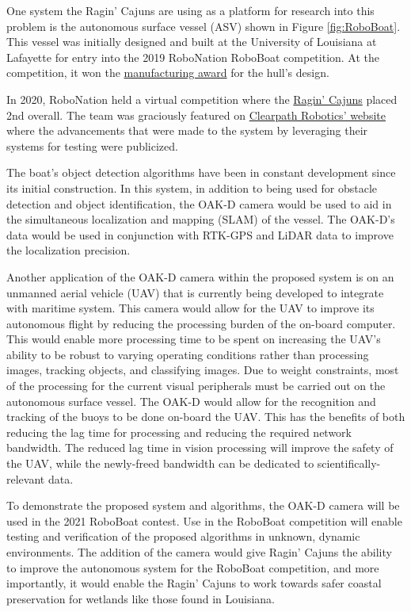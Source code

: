 \documentclass[12 pt]{article}
\begin{document}
%
One system the Ragin' Cajuns are using as a platform for research into this problem is the autonomous surface vessel (ASV) shown in Figure \ref{fig:RoboBoat}. This vessel was initially designed and built at the University of Louisiana at Lafayette for entry into the 2019 RoboNation RoboBoat competition. At the competition, it won the \href{https://mechanical.louisiana.edu/news-events/news/20190627/university-team-earns-manufacturing-award-international-roboboat}{manufacturing award} for the hull's design. 

In 2020, RoboNation held a virtual competition where the \href{https://crawlab.github.io/RoboBoat-2020/} {Ragin' Cajuns} placed 2nd overall. The team was graciously featured on \href{https://clearpathrobotics.com/blog/2020/11/research-team-uses-clearpath-simulation-in-second-place-finish-at-roboboat-2020/}{Clearpath Robotics' website} where the advancements that were made to the system by leveraging their systems for testing were publicized. 

The boat's object detection algorithms have been in constant development since its initial construction. In this system, in addition to being used for obstacle detection and object identification, the OAK-D camera would be used to aid in the simultaneous localization and mapping (SLAM) of the vessel. The OAK-D's data would be used in conjunction with RTK-GPS and LiDAR data to improve the localization precision. 

Another application of the OAK-D camera within the proposed system is on an unmanned aerial vehicle (UAV) that is currently being developed to integrate with maritime system. This camera would allow for the UAV to improve its autonomous flight by reducing the processing burden of the on-board computer. This would enable more processing time to be spent on increasing the UAV's ability to be robust to varying operating conditions rather than processing images, tracking objects, and classifying images. Due to weight constraints, most of the processing for the current visual peripherals must be carried out on the autonomous surface vessel. The OAK-D would allow for the recognition and tracking of the buoys to be done on-board the UAV. This has the benefits of both reducing the lag time for processing and reducing the required network bandwidth. The reduced lag time in vision processing will improve the safety of the UAV, while the newly-freed bandwidth can be dedicated to scientifically-relevant data.

To demonstrate the proposed system and algorithms, the OAK-D camera will be used in the 2021 RoboBoat contest. Use in the RoboBoat competition will enable testing and verification of the proposed algorithms in unknown, dynamic environments. The addition of the camera would give Ragin' Cajuns the ability to improve the autonomous system for the RoboBoat competition, and more importantly, it would enable the Ragin' Cajuns to work towards safer coastal preservation for wetlands like those found in Louisiana.
\end{document}
